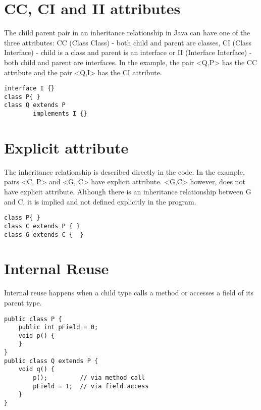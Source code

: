 \documentclass{uvamscse}
\begin{document}
\section{CC, CI and II attributes}
\begin{multicols}{2}
The child parent pair in an inheritance relationship in Java can have one of the three attributes: CC (Class Class) - both child and parent are classes, CI (Class Interface) - child is a class and parent is an interface or II (Interface Interface) - both child and parent are interfaces. In the example, the pair <Q,P> has the CC attribute and the pair <Q,I> has the CI attribute.
\columnbreak
\begin{verbatim}
interface I {}
class P{ }
class Q extends P 
        implements I {}  
\end{verbatim}
\end{multicols}


\section{Explicit attribute}
\begin{multicols}{2}
The inheritance relationship is described directly in the code. In the example, pairs <C, P> and <G, C> have explicit attribute. <G,C> however, does not have explicit attribute. Although there is an inheritance relationship between G and C, it is implied and not defined explicitly in the program.
\columnbreak
\begin{verbatim}
class P{ }
class C extends P { } 
class G extends C {  } 
\end{verbatim}
\end{multicols}




\section{Internal Reuse}
\begin{multicols}{2}
Internal reuse happens when a child type calls a method or accesses a field of its parent type. 
\columnbreak
\begin{verbatim}
public class P {
    public int pField = 0;
    void p() {
    }
}
public class Q extends P {
    void q() {
        p();         // via method call
        pField = 1;  // via field access
    }
}
\end{verbatim}
\end{multicols}
\end{document}
